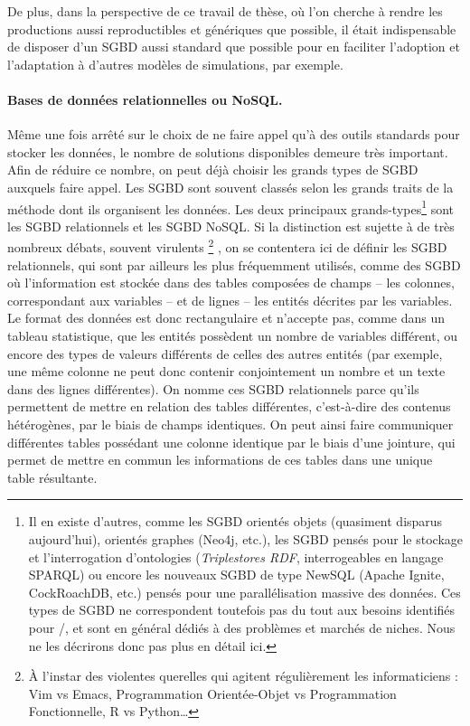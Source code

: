 De plus, dans la perspective de ce travail de thèse, où l'on cherche à rendre les productions aussi reproductibles et génériques que possible, il était indispensable de disposer d'un SGBD aussi standard que possible pour en faciliter l'adoption et l'adaptation à d'autres modèles de simulations, par exemple.

\paragraph{Bases de données relationnelles ou NoSQL.}\label{par:sql-nosql}

Même une fois arrêté sur le choix de ne faire appel qu'à des outils standards pour stocker les données, le nombre de solutions disponibles demeure très important.
Afin de réduire ce nombre, on peut déjà choisir les grands types de SGBD auxquels faire appel.
Les SGBD sont souvent classés selon les grands traits de la méthode dont ils organisent les données.
Les deux principaux \og grands-types\fg{}\footnote{
	Il en existe d'autres, comme les SGBD orientés objets (quasiment disparus aujourd'hui), orientés graphes (Neo4j, etc.), les SGBD pensés pour le stockage et l'interrogation d'ontologies (\textit{Triplestores RDF}, interrogeables en langage SPARQL) ou encore les nouveaux SGBD de type \og NewSQL \fg{} (Apache Ignite, CockRoachDB, etc.) pensés pour une parallélisation massive des données. Ces types de SGBD ne correspondent toutefois pas du tout aux besoins identifiés pour \simedb{}/\simfeodal{}, et sont en général dédiés à des problèmes et marchés de niches. Nous ne les décrirons donc pas plus en détail ici.
} sont les SGBD \og relationnels\fg{} et les SGBD \og NoSQL\fg{}.
Si la distinction est sujette à de très nombreux débats, souvent virulents
\footnote{
	À l'instar des violentes querelles qui agitent régulièrement les informaticiens : Vim vs Emacs, Programmation Orientée-Objet vs Programmation Fonctionnelle, R vs Python\ldots
}
, on se contentera ici de définir les SGBD relationnels, qui sont par ailleurs les plus fréquemment utilisés, comme des SGBD où l'information est stockée dans des tables composées de champs -- les colonnes, correspondant aux variables -- et de lignes -- les entités décrites par les variables.
Le format des données est donc rectangulaire et n'accepte pas, comme dans un tableau statistique, que les entités possèdent un nombre de variables différent, ou encore des types de valeurs différents de celles des autres entités (par exemple, une même colonne ne peut donc contenir conjointement un nombre et un texte dans des lignes différentes).
On nomme ces SGBD \og relationnels\fg{} parce qu'ils permettent de mettre en relation des tables différentes, c'est-à-dire des contenus hétérogènes, par le biais de champs identiques.
On peut ainsi faire communiquer différentes tables possédant une colonne identique par le biais d'une jointure, qui permet de mettre en commun les informations de ces tables dans une unique table résultante.


